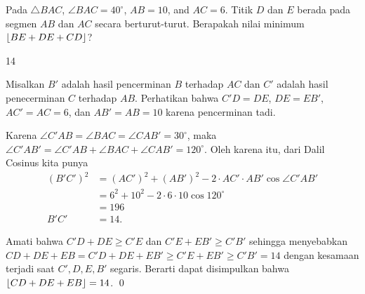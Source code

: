 \documentclass[11pt]{scrartcl}
\begin{document}
	\begin{soalbaru}
		Pada $\triangle BAC$, $\angle BAC = 40^\circ$, $AB=10$, and $AC=6$. Titik $D$ dan $E$ berada pada segmen $AB$ dan $AC$ secara berturut-turut. Berapakah nilai minimum $\left\lfloor BE+DE+CD \right\rfloor$?
		
		\begin{jawaban}
		14
		\end{jawaban}
		\begin{solusi}
		Misalkan $B'$ adalah hasil pencerminan $B$ terhadap $AC$ dan $C'$ adalah hasil penecerminan $C$ terhadap $AB$. Perhatikan bahwa $C'D=DE$, $DE=EB'$, $AC'=AC=6$, dan $AB'=AB=10$ karena pencerminan tadi. 
		
		Karena $\angle C'AB = \angle BAC = \angle CAB'=30^\circ$, maka $\angle C'AB' = \angle C'AB + \angle BAC + \angle CAB' = 120^\circ$. Oleh karena itu, dari Dalil Cosinus kita punya 
		\begin{align*}
		(B'C')^2 &= (AC')^2+(AB')^2-2\cdot AC' \cdot AB' \cos \angle C'AB'\\
		&= 6^2+10^2-2\cdot 6\cdot 10 \cos 120^\circ\\
		&= 196\\
		B'C' &= 14.
		\end{align*} 
		
		Amati bahwa $C'D+DE \ge C'E$ dan $C'E+EB' \ge C'B'$ sehingga menyebabkan \\$CD+DE+EB=C'D+DE+EB' \ge C'E +EB' \ge C'B'=14$ dengan kesamaan terjadi saat $C',D,E,B'$ segaris. Berarti dapat disimpulkan bahwa $\left\lfloor CD+DE+EB \right\rfloor=14$. \qed
		\end{solusi}
	\end{soalbaru}
	
\end{document}
